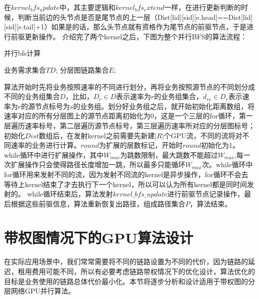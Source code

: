  在$kernel_bfs_update$中，其主要逻辑和$kernel_bfs_extend$一样，在进行更新判断的时候，判断当前边的头节点是否是尾节点的上一层（Dist[lid][sid][e.head]==Dist[lid][sid][e.tail]+1）如果是的话，那么头节点就有资格作为尾节点的前驱节点，于是进行前驱更新操作。
  介绍完了两个kernel之后，下图为整个并行BFS的算法流程：
\begin{algorithm}[t]
\begin{algorithmic}[1]
\caption{{并行bfs计算}}
\label{ParaSPC}
\Require
	 业务需求集合$TD$;
      分层图链路集合$E$;
\EndFor
\EndFor
\EndFor
{}
\EndFor
{}
\EndWhile
{}
\EndFor
{}
\end{algorithmic}
\end{algorithm}
 算法开始时先将业务按照速率的不同进行划分，再将业务按照源节点的不同划分成不同的业务组集合$D$，比如，$D_r \in D$表示速率为$r$的业务组集合，$d_{rs} \in D_r$表示速率为$r$的源节点标号为$s$的业务组。划分好业务组之后，就开始初始化距离数组，将速率对应的所有分层图上的源节点距离初始化为0，这是一个三层的for循环，第一层遍历速率标号，第二层遍历源节点标号，第三层遍历速率所对应的分层图标号；初始化$Dist$数组后，在发射kernel之前需要先新建$|R|$个GPU流，不同的流将对不同速率的业务进行计算。$round$为扩展的层数标记，开始时$round$初始化为1。while循环中进行扩展操作，其中$W_{max}$为跳数限制，最大跳数不能超过$W_{max}$,每一次扩展操作只会使得路径长度增加一跳，所以最多只能循环$W_{max}$次。while循环中for循环用来发射不同的流，因为发射不同流的kernel是异步操作，for循环不会去等待上kernel结束了才去执行下一个kernel，所以可以认为所有kernel都是同时间发射的。
while循环结束后，算法发射$kernel\_bfs\_update$进行前驱节点记录操作，最后根据这些前驱信息，算法重新恢复出路径，组成路径集合$P$，算法结束。
\section{带权图情况下的GPU算法设计}  
  在实际应用场景中，我们常常需要将不同的链路设置为不同的代价，因为链路的延迟，租用费用可能不同，所以有必要考虑链路带权情况下的优化设计，算法优化的目标是业务使用的链路总体代价最小化。本节将逐步分析和设计适用于带权图的分层网络GPU并行算法。
